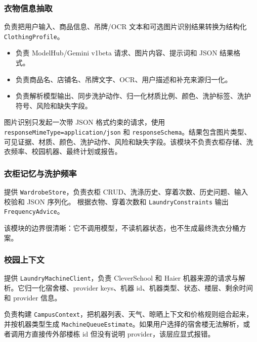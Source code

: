 \documentclass[11pt,a4paper]{ctexart}
\begin{document}
\subsubsection{衣物信息抽取}

 负责把用户输入、商品信息、吊牌/OCR 文本和可选图片识别结果转换为结构化 \texttt{ClothingProfile}。

\begin{itemize}
  \item {} 负责 ModelHub/Gemini v1beta 请求、图片内容、提示词和 JSON 结果格式。
  \item {} 负责商品名、店铺名、吊牌文字、OCR、用户描述和补充来源归一化。
  \item {} 负责解析模型输出、同步洗护动作、归一化材质比例、颜色、洗护标签、洗护符号、风险和缺失字段。
\end{itemize}

图片识别只发起一次带 JSON 格式约束的请求，使用 \texttt{responseMimeType=application/json} 和 \texttt{responseSchema}。结果包含图片类型、可见证据、材质、颜色、洗护动作、风险和缺失字段。该模块不负责衣柜存储、洗衣频率、校园机器、最终计划或报告。

\subsubsection{衣柜记忆与洗护频率}

 提供 \texttt{WardrobeStore}，负责衣柜 CRUD、洗涤历史、穿着次数、历史问题、输入校验和 JSON 序列化。 根据衣物、穿着次数和 \texttt{LaundryConstraints} 输出 \texttt{FrequencyAdvice}。

该模块的边界很清晰：它不调用模型，不读机器状态，也不生成最终洗衣分桶方案。

\subsubsection{校园上下文}

 提供 \texttt{LaundryMachineClient}，负责 CleverSchool 和 Haier 机器来源的请求与解析。它归一化宿舍楼、provider keys、机器 id、机器类型、状态、楼层、剩余时间和 provider 信息。

 负责构建 \texttt{CampusContext}，把机器列表、天气、晾晒上下文和价格规则组合起来，并按机器类型生成 \texttt{MachineQueueEstimate}。如果用户选择的宿舍楼无法解析，或者调用方直接传外部楼栋 id 但没有说明 provider，该层应显式报错。
\end{document}
